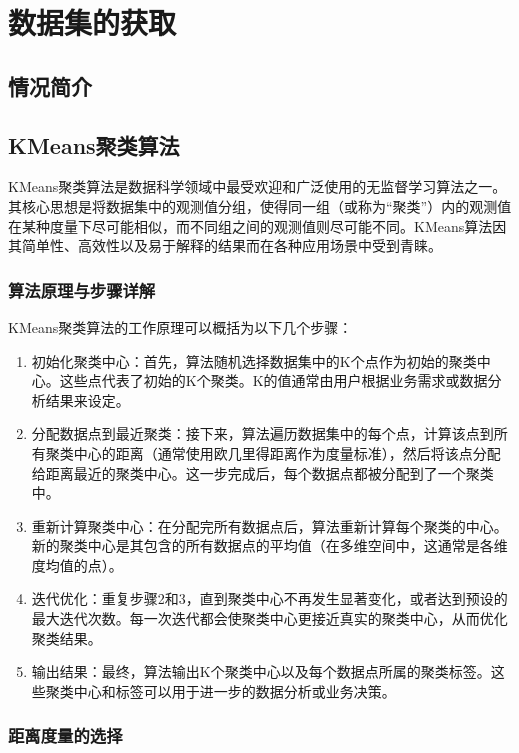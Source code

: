 \chapter{数据集的获取}
\label{chapter:3}

\section{情况简介}

\section{KMeans聚类算法}

KMeans聚类算法是数据科学领域中最受欢迎和广泛使用的无监督学习算法之一。其核心思想是将数据集中的观测值分组，使得同一组（或称为“聚类”）内的观测值在某种度量下尽可能相似，而不同组之间的观测值则尽可能不同。KMeans算法因其简单性、高效性以及易于解释的结果而在各种应用场景中受到青睐。

\subsection{算法原理与步骤详解}

KMeans聚类算法的工作原理可以概括为以下几个步骤：

\begin{enumerate}
	\item {初始化聚类中心}：首先，算法随机选择数据集中的K个点作为初始的聚类中心。这些点代表了初始的K个聚类。K的值通常由用户根据业务需求或数据分析结果来设定。
	\item {分配数据点到最近聚类}：接下来，算法遍历数据集中的每个点，计算该点到所有聚类中心的距离（通常使用欧几里得距离作为度量标准），然后将该点分配给距离最近的聚类中心。这一步完成后，每个数据点都被分配到了一个聚类中。
	\item {重新计算聚类中心}：在分配完所有数据点后，算法重新计算每个聚类的中心。新的聚类中心是其包含的所有数据点的平均值（在多维空间中，这通常是各维度均值的点）。
	\item {迭代优化}：重复步骤2和3，直到聚类中心不再发生显著变化，或者达到预设的最大迭代次数。每一次迭代都会使聚类中心更接近真实的聚类中心，从而优化聚类结果。
	\item {输出结果}：最终，算法输出K个聚类中心以及每个数据点所属的聚类标签。这些聚类中心和标签可以用于进一步的数据分析或业务决策。
\end{enumerate}

\subsection{距离度量的选择}

